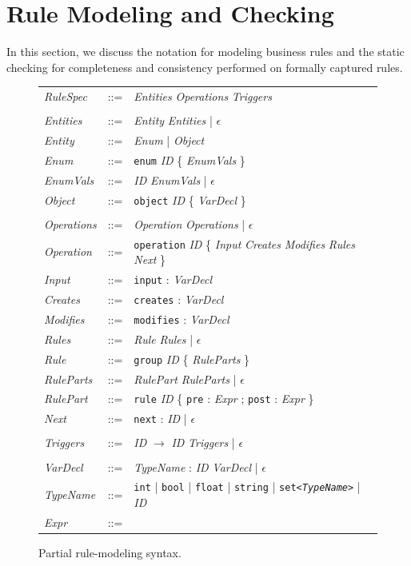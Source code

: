 
\newcommand{\term}{\textit}
\newcommand{\lit}{\texttt}

\section{Rule Modeling and Checking}
\label{sec:model}

In this section, we discuss the notation for modeling business rules and the
static checking for completeness and consistency performed on formally captured
rules.

\begin{figure}[t]
\centering
{\small
\tabcolsep=3pt
\begin{tabular}{lll}
\term{RuleSpec} & ::= & \term{Entities} \term{Operations} \term{Triggers} \\
\\
\term{Entities} & ::= & \term{Entity} \term{Entities} | $\epsilon$ \\
\term{Entity} & ::= & \term{Enum} | \term{Object} \\
\term{Enum} & ::= & \lit{enum} \term{ID} \{ \term{EnumVals} \} \\
\term{EnumVals} & ::= & \term{ID} \term{EnumVals} | $\epsilon$ \\
\term{Object} & ::= & \lit{object} \term{ID} \{ \term{VarDecl} \} \\
\\
\term{Operations} & ::= & \term{Operation} \term{Operations} | $\epsilon$ \\
\term{Operation} & ::= & \lit{operation} \term{ID} \{ \term{Input}
\term{Creates} \term{Modifies} \term{Rules} \term{Next} \} \\
\term{Input} & ::= & \lit{input} : \term{VarDecl} \\
\term{Creates} & ::= & \lit{creates} : \term{VarDecl} \\
\term{Modifies} & ::= & \lit{modifies} : \term{VarDecl} \\
\term{Rules} & ::= & \term{Rule} \term{Rules} | $\epsilon$ \\
\term{Rule} & ::= & \lit{group} \term{ID} \{ \term{RuleParts} \} \\
\term{RuleParts} & ::= & \term{RulePart} \term{RuleParts} | $\epsilon$ \\
\term{RulePart} & ::= & \lit{rule} \term{ID} \{ \lit{pre} : \term{Expr} ;
\lit{post} : \term{Expr} \} \\
\term{Next} & ::= & \lit{next} : \term{ID} | $\epsilon$ \\
\\
\term{Triggers} & ::= & \term{ID} $\rightarrow$ \term{ID} \term{Triggers} | $\epsilon$ \\
\\
\term{VarDecl} & ::= & \term{TypeName} : \term{ID} \term{VarDecl} | $\epsilon$
\\
\term{TypeName} & ::= & \lit{int} | \lit{bool} | \lit{float} | \lit{string} |
\lit{set<\term{\textrm{TypeName}}>} | \term{ID} \\
\term{Expr} & ::= & \\
\end{tabular}
}
\caption{Partial rule-modeling syntax.}
\label{fig:model-syntax}
\end{figure}


